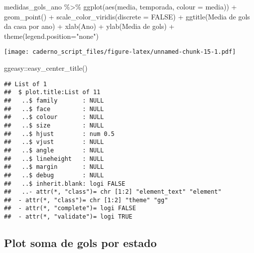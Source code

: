 \documentclass[
]{article}
\newenvironment{Shaded}{\begin{snugshade}}{\end{snugshade}}
\newcommand{\AttributeTok}[1]{\textcolor[rgb]{0.77,0.63,0.00}{#1}}
\newcommand{\ConstantTok}[1]{\textcolor[rgb]{0.00,0.00,0.00}{#1}}
\newcommand{\FunctionTok}[1]{\textcolor[rgb]{0.00,0.00,0.00}{#1}}
\newcommand{\NormalTok}[1]{#1}
\newcommand{\SpecialCharTok}[1]{\textcolor[rgb]{0.00,0.00,0.00}{#1}}
\newcommand{\StringTok}[1]{\textcolor[rgb]{0.31,0.60,0.02}{#1}}
\begin{document}
\begin{Shaded}
\begin{Highlighting}[]
\NormalTok{medidas\_gols\_ano }\SpecialCharTok{\%\textgreater{}\%}
  \FunctionTok{ggplot}\NormalTok{(}\FunctionTok{aes}\NormalTok{(media, temporada, }\AttributeTok{colour =}\NormalTok{ media)) }\SpecialCharTok{+} \FunctionTok{geom\_point}\NormalTok{() }\SpecialCharTok{+}
  \FunctionTok{scale\_color\_viridis}\NormalTok{(}\AttributeTok{discrete =} \ConstantTok{FALSE}\NormalTok{) }\SpecialCharTok{+}
  \FunctionTok{ggtitle}\NormalTok{(}\StringTok{\textquotesingle{}Media de gols da casa por ano\textquotesingle{}}\NormalTok{) }\SpecialCharTok{+} 
  \FunctionTok{xlab}\NormalTok{(}\StringTok{\textquotesingle{}Ano\textquotesingle{}}\NormalTok{) }\SpecialCharTok{+} \FunctionTok{ylab}\NormalTok{(}\StringTok{\textquotesingle{}Media de gols\textquotesingle{}}\NormalTok{) }\SpecialCharTok{+}
  \FunctionTok{theme}\NormalTok{(}\AttributeTok{legend.position=}\StringTok{"none"}\NormalTok{)}
\end{Highlighting}
\end{Shaded}

\texttt{[image: caderno\_script\_files/figure-latex/unnamed-chunk-15-1.pdf]}

\begin{Shaded}
\begin{Highlighting}[]
\NormalTok{   ggeasy}\SpecialCharTok{::}\FunctionTok{easy\_center\_title}\NormalTok{()}
\end{Highlighting}
\end{Shaded}

\begin{verbatim}
## List of 1
##  $ plot.title:List of 11
##   ..$ family       : NULL
##   ..$ face         : NULL
##   ..$ colour       : NULL
##   ..$ size         : NULL
##   ..$ hjust        : num 0.5
##   ..$ vjust        : NULL
##   ..$ angle        : NULL
##   ..$ lineheight   : NULL
##   ..$ margin       : NULL
##   ..$ debug        : NULL
##   ..$ inherit.blank: logi FALSE
##   ..- attr(*, "class")= chr [1:2] "element_text" "element"
##  - attr(*, "class")= chr [1:2] "theme" "gg"
##  - attr(*, "complete")= logi FALSE
##  - attr(*, "validate")= logi TRUE
\end{verbatim}

\hypertarget{plot-soma-de-gols-por-estado}{%
\subsection{Plot soma de gols por
estado}\label{plot-soma-de-gols-por-estado}}
\end{document}
